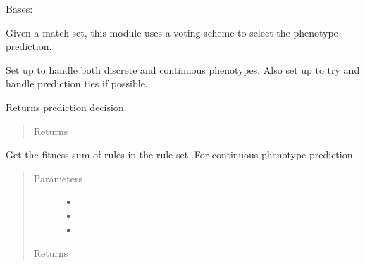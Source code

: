 \documentclass[letterpaper,10pt,english]{sphinxmanual}
\begin{document}
\begin{fulllineitems}
\label{\detokenize{eLCS:eLCS.Prediction.Prediction}}
Bases: 

Given a match set, this module uses a voting scheme to select the phenotype prediction.

Set up to handle both discrete and continuous phenotypes.
Also set up to try and handle prediction ties if possible.

\begin{fulllineitems}
\label{\detokenize{eLCS:eLCS.Prediction.Prediction.getDecision}}
Returns prediction decision.
\begin{quote}\begin{description}
\item[{Returns}] \leavevmode


\end{description}\end{quote}

\end{fulllineitems}


\begin{fulllineitems}
\label{\detokenize{eLCS:eLCS.Prediction.Prediction.getFitnessSum}}
Get the fitness sum of rules in the rule-set. For continuous phenotype prediction.
\begin{quote}\begin{description}
\item[{Parameters}] \leavevmode\begin{itemize}
\item {} 
 \textendash{} 

\item {} 
 \textendash{} 

\item {} 
 \textendash{} 

\end{itemize}

\item[{Returns}] \leavevmode


\end{description}\end{quote}

\end{fulllineitems}


\end{fulllineitems}
\end{document}
